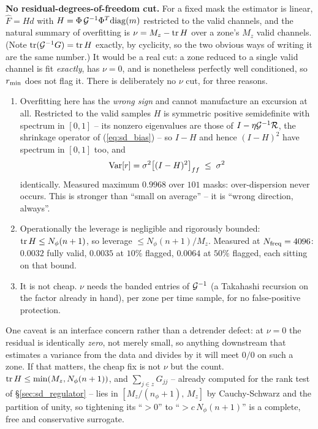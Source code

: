 \documentclass{article}
\numberwithin{equation}{section}   %
\begin{document}
{\bf No residual-degrees-of-freedom cut.}  For a fixed mask the estimator is linear, $\hat F = Hd$ with
$H = \Phi\,{\cal G}^{-1}\Phi^T{\rm diag}(m)$ restricted to the valid channels, and the natural summary of
overfitting is $\nu = M_z - {\rm tr}\,H$ over a zone's $M_z$ valid channels.  (Note
${\rm tr}({\cal G}^{-1}G) = {\rm tr}\,H$ exactly, by cyclicity, so the two obvious ways of writing it are the
same number.)  It would be a real cut: a zone reduced to a single valid channel is fit {\em exactly}, has
$\nu = 0$, and is nonetheless perfectly well conditioned, so $r_{\rm min}$ does not flag it.  There is
deliberately no $\nu$ cut, for three reasons.
\begin{enumerate}
\item Overfitting here has the {\em wrong sign} and cannot manufacture an excursion at all.  Restricted to the
valid samples $H$ is symmetric positive semidefinite with spectrum in $[0,1]$ -- its nonzero eigenvalues are
those of $I - \eta{\cal G}^{-1}{\cal R}$, the shrinkage operator of (\ref{eq:sd_bias}) -- so $I-H$ and hence
$(I-H)^2$ have spectrum in $[0,1]$ too, and
\begin{equation}
{\rm Var}[r] = \sigma^2\big[(I-H)^2\big]_{ff} \;\le\; \sigma^2
\end{equation}
identically.  Measured maximum $0.9968$ over $101$ masks: over-dispersion never occurs.  This is stronger than
``small on average'' -- it is ``wrong direction, always''.
\item Operationally the leverage is negligible and rigorously bounded: ${\rm tr}\,H \le N_\phi(n+1)$, so
leverage $\le N_\phi(n+1)/M_z$.  Measured at $N_{\rm freq} = 4096$: $0.0032$ fully valid, $0.0035$ at $10\%$
flagged, $0.0064$ at $50\%$ flagged, each sitting on that bound.
\item It is not cheap.  $\nu$ needs the banded entries of ${\cal G}^{-1}$ (a Takahashi recursion on the factor
already in hand), per zone per time sample, for no false-positive protection.
\end{enumerate}
One caveat is an interface concern rather than a detrender defect: at $\nu = 0$ the residual is identically
{\em zero}, not merely small, so anything downstream that estimates a variance from the data and divides by it
will meet $0/0$ on such a zone.  If that matters, the cheap fix is not $\nu$ but the count.
${\rm tr}\,H \le \min(M_z, N_\phi(n+1))$, and $\sum_{j \in z} G_{jj}$ -- already computed for the rank test of
\S\ref{sec:sd_regulator} -- lies in $[M_z/(n_\phi{+}1),\, M_z]$ by Cauchy-Schwarz and the partition of unity,
so tightening its ``$> 0$'' to ``$> c\,N_\phi(n{+}1)$'' is a complete, free and conservative surrogate.
\end{document}
